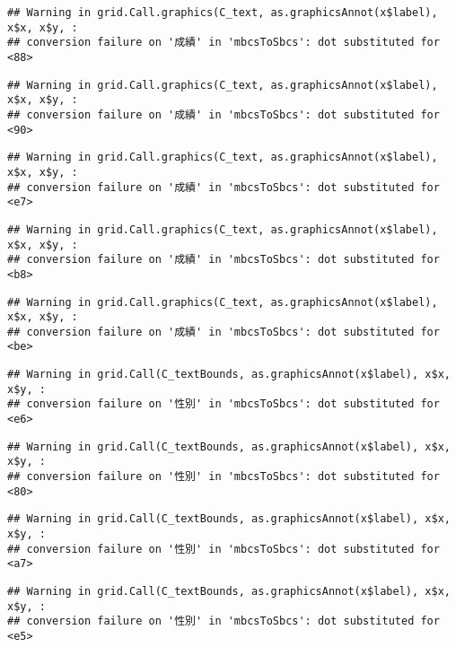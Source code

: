\documentclass[
]{book}
\begin{document}
\begin{verbatim}
## Warning in grid.Call.graphics(C_text, as.graphicsAnnot(x$label), x$x, x$y, :
## conversion failure on '成績' in 'mbcsToSbcs': dot substituted for <88>
\end{verbatim}

\begin{verbatim}
## Warning in grid.Call.graphics(C_text, as.graphicsAnnot(x$label), x$x, x$y, :
## conversion failure on '成績' in 'mbcsToSbcs': dot substituted for <90>
\end{verbatim}

\begin{verbatim}
## Warning in grid.Call.graphics(C_text, as.graphicsAnnot(x$label), x$x, x$y, :
## conversion failure on '成績' in 'mbcsToSbcs': dot substituted for <e7>
\end{verbatim}

\begin{verbatim}
## Warning in grid.Call.graphics(C_text, as.graphicsAnnot(x$label), x$x, x$y, :
## conversion failure on '成績' in 'mbcsToSbcs': dot substituted for <b8>
\end{verbatim}

\begin{verbatim}
## Warning in grid.Call.graphics(C_text, as.graphicsAnnot(x$label), x$x, x$y, :
## conversion failure on '成績' in 'mbcsToSbcs': dot substituted for <be>
\end{verbatim}

\begin{verbatim}
## Warning in grid.Call(C_textBounds, as.graphicsAnnot(x$label), x$x, x$y, :
## conversion failure on '性別' in 'mbcsToSbcs': dot substituted for <e6>
\end{verbatim}

\begin{verbatim}
## Warning in grid.Call(C_textBounds, as.graphicsAnnot(x$label), x$x, x$y, :
## conversion failure on '性別' in 'mbcsToSbcs': dot substituted for <80>
\end{verbatim}

\begin{verbatim}
## Warning in grid.Call(C_textBounds, as.graphicsAnnot(x$label), x$x, x$y, :
## conversion failure on '性別' in 'mbcsToSbcs': dot substituted for <a7>
\end{verbatim}

\begin{verbatim}
## Warning in grid.Call(C_textBounds, as.graphicsAnnot(x$label), x$x, x$y, :
## conversion failure on '性別' in 'mbcsToSbcs': dot substituted for <e5>
\end{verbatim}
\end{document}
